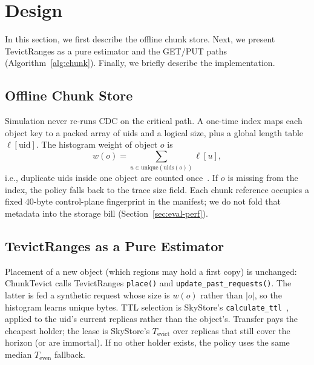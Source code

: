 \section{Design}
\label{sec:design}

In this section, we first describe the offline chunk store.
Next, we present TevictRanges as a pure estimator and the {GET}/{PUT} paths (Algorithm~\ref{alg:chunk}).
Finally, we briefly describe the implementation.

\subsection{Offline Chunk Store}

Simulation never re-runs {CDC} on the critical path.
A one-time index maps each object key to a packed array of uids and a logical size, plus a global length table $\ell[\mathrm{uid}]$.
The histogram weight of object $o$ is
\begin{equation}
  w(o)=\sum_{u \in \mathrm{unique}(\mathrm{uids}(o))} \ell[u],
\end{equation}
i.e., duplicate uids inside one object are counted once~\cite{lbfs2001}.
If $o$ is missing from the index, the policy falls back to the trace size field.
Each chunk reference occupies a fixed $40$-byte control-plane fingerprint in the manifest; we do not fold that metadata into the storage bill (Section~\ref{sec:eval-perf}).

\subsection{TevictRanges as a Pure Estimator}

Placement of a new object (which regions may hold a first copy) is unchanged: ChunkTevict calls TevictRanges \texttt{place()} and \texttt{update\_past\_requests()}.
The latter is fed a synthetic request whose size is $w(o)$ rather than $|o|$, so the histogram learns unique bytes.
{TTL} selection is SkyStore's \texttt{calculate\_ttl}~\cite{skystore2025}, applied to the uid's current replicas rather than the object's.
Transfer pays the cheapest holder; the lease is SkyStore's $T_{\mathrm{evict}}$ over replicas that still cover the horizon (or are immortal).
If no other holder exists, the policy uses the same median $T_{\mathrm{even}}$ fallback.

